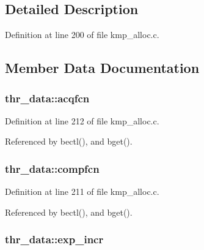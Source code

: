 \subsection{Detailed Description}


Definition at line 200 of file kmp\-\_\-alloc.\-c.



\subsection{Member Data Documentation}
\hypertarget{structthr__data_a56f7eab7df7b5d625e22cda6805f2b40}{
\subsubsection[{acqfcn}]{ thr\-\_\-data\-::acqfcn}}\label{structthr__data_a56f7eab7df7b5d625e22cda6805f2b40}


Definition at line 212 of file kmp\-\_\-alloc.\-c.



Referenced by bectl(), and bget().

\hypertarget{structthr__data_ac022ffa492a079f49040bd922cd9dcf8}{
\subsubsection[{compfcn}]{ thr\-\_\-data\-::compfcn}}\label{structthr__data_ac022ffa492a079f49040bd922cd9dcf8}


Definition at line 211 of file kmp\-\_\-alloc.\-c.



Referenced by bectl(), and bget().

\hypertarget{structthr__data_ad76a1f415abd6cbf1c4f9b2c091e3c21}{
\subsubsection[{exp\-\_\-incr}]{ thr\-\_\-data\-::exp\-\_\-incr}}\label{structthr__data_ad76a1f415abd6cbf1c4f9b2c091e3c21}


